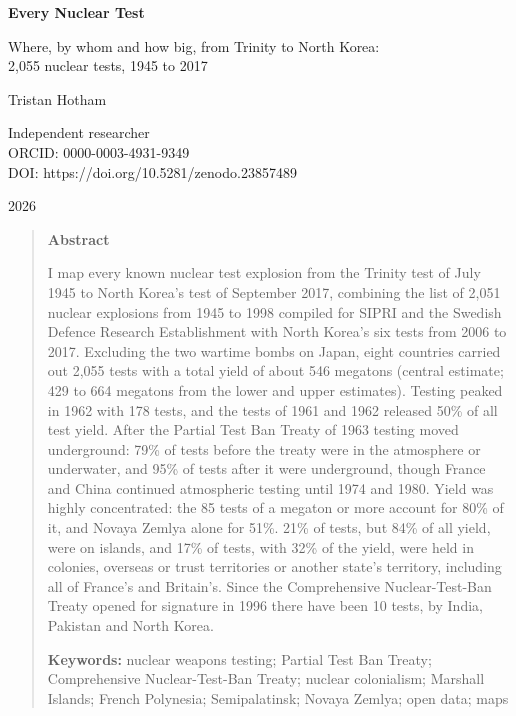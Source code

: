 \documentclass[11pt,a4paper]{article}
\begin{document}
\begin{center}
{\Large\bfseries Every Nuclear Test\par}
\vspace{0.4em}
{\large Where, by whom and how big, from Trinity to North Korea:\\2,055 nuclear tests, 1945 to 2017\par}
\vspace{1.2em}
{\large Tristan Hotham\par}
\vspace{0.3em}
{\small Independent researcher\\
ORCID: 0000-0003-4931-9349\\
DOI: https://doi.org/10.5281/zenodo.23857489\par}
\vspace{0.8em}
2026
\end{center}

\begin{quote}
\small
\begin{center}\textbf{Abstract}\end{center}
I map every known nuclear test explosion from the Trinity test of July 1945 to North Korea's test of September 2017, combining the list of 2,051 nuclear explosions from 1945 to 1998 compiled for SIPRI and the Swedish Defence Research Establishment with North Korea's six tests from 2006 to 2017. Excluding the two wartime bombs on Japan, eight countries carried out 2,055 tests with a total yield of about 546 megatons (central estimate; 429 to 664 megatons from the lower and upper estimates). Testing peaked in 1962 with 178 tests, and the tests of 1961 and 1962 released 50\% of all test yield. After the Partial Test Ban Treaty of 1963 testing moved underground: 79\% of tests before the treaty were in the atmosphere or underwater, and 95\% of tests after it were underground, though France and China continued atmospheric testing until 1974 and 1980. Yield was highly concentrated: the 85 tests of a megaton or more account for 80\% of it, and Novaya Zemlya alone for 51\%. 21\% of tests, but 84\% of all yield, were on islands, and 17\% of tests, with 32\% of the yield, were held in colonies, overseas or trust territories or another state's territory, including all of France's and Britain's. Since the Comprehensive Nuclear-Test-Ban Treaty opened for signature in 1996 there have been 10 tests, by India, Pakistan and North Korea.

\textbf{Keywords:} nuclear weapons testing; Partial Test Ban Treaty; Comprehensive Nuclear-Test-Ban Treaty; nuclear colonialism; Marshall Islands; French Polynesia; Semipalatinsk; Novaya Zemlya; open data; maps
\end{quote}
\end{document}
